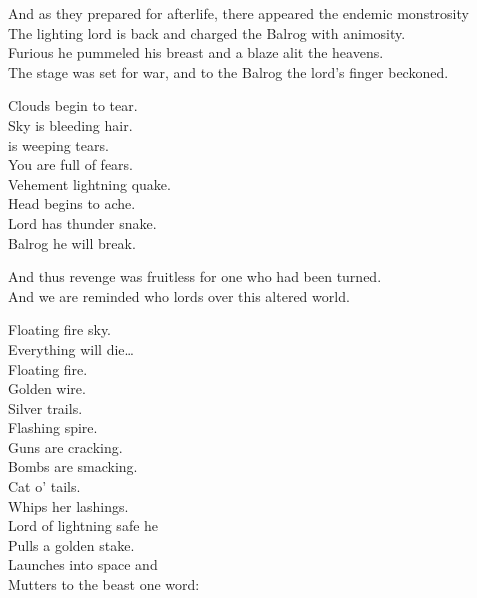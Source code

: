 And as they prepared for afterlife, there appeared the endemic monstrosity \\
The lighting lord is back and charged the Balrog with animosity. \\

Furious he pummeled his breast and a blaze alit the heavens. \\
The stage was set for war, and to the Balrog the lord's finger beckoned. \\





Clouds begin to tear. \\
Sky is bleeding hair. \\
 is weeping tears. \\
You are full of fears. \\

Vehement lightning quake. \\
Head begins to ache. \\
Lord has thunder snake. \\
Balrog he will break. \\


And thus revenge was fruitless for one who had been turned. \\
And we are reminded who lords over this altered world. \\


Floating fire sky. \\
Everything will die… \\

Floating fire. \\
Golden wire. \\
Silver trails. \\
Flashing spire. \\

Guns are cracking. \\
Bombs are smacking. \\
Cat o' tails. \\
Whips her lashings. \\

Lord of lightning safe he \\
Pulls a golden stake. \\
Launches into space and \\
Mutters to the beast one word: \\

